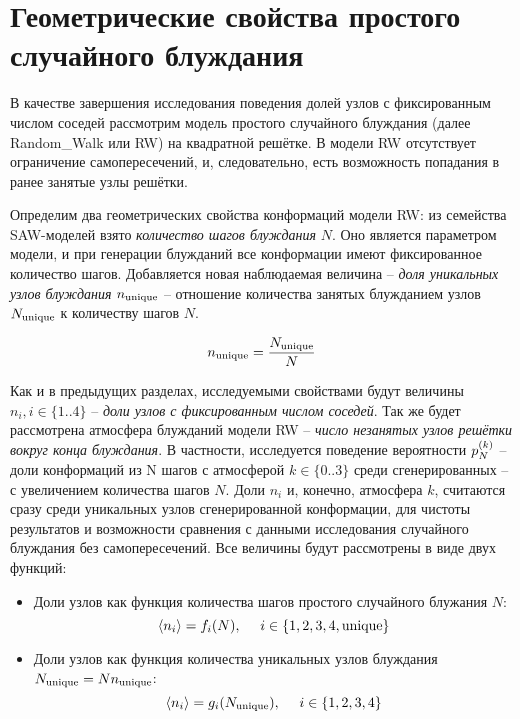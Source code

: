 \section{Геометрические свойства простого случайного блуждания}

В качестве завершения исследования поведения долей узлов с фиксированным числом соседей рассмотрим модель простого случайного блуждания (далее Random\_Walk или RW) на квадратной решётке. 
В модели RW отсутствует ограничение самопересечений, и, следовательно, есть возможность попадания в ранее занятые узлы решётки.

Определим два геометрических свойства конформаций модели RW: из семейства SAW-моделей взято \textit{количество шагов блуждания} $N$. 
Оно является параметром модели, и при генерации блужданий все конформации имеют фиксированное количество шагов.
Добавляется новая наблюдаемая величина -- \textit{доля уникальных узлов блуждания} $n_{\textup{unique}}$ -- отношение количества занятых блужданием узлов $N_{\textup{unique}}$ к количеству шагов $N$.

\begin{equation}
n_{\textup{unique}} = \frac{N_{\textup{unique}}}{N}
\label{eq:nun}
\end{equation}

Как и в предыдущих разделах, исследуемыми свойствами будут величины $n_i, i \in \{1..4\}$ -- \textit{доли узлов с фиксированным числом соседей}. 
Так же будет рассмотрена атмосфера блужданий модели RW -- \textit{число незанятых узлов решётки вокруг конца блуждания}. 
В частности, исследуется поведение вероятности $p^{(k)}_N$ -- доли конформаций из N шагов с атмосферой $k \in \{0..3\}$ среди сгенерированных -- с увеличением количества шагов $N$.
Доли $n_i$ и, конечно, атмосфера $k$, считаются сразу среди уникальных узлов сгенерированной конформации, для чистоты результатов и возможности сравнения с данными исследования случайного блуждания без самопересечений.
Все величины будут рассмотрены в виде двух функций:

\begin{itemize}
\item Доли узлов как функция количества шагов простого случайного блужания $N$: 
\begin{equation}
 \langle n_i \rangle = f_i(N),\ \ \ \ i \in \{1,2,3,4, \textup{unique}\}
\end{equation}
\item Доли узлов как функция количества уникальных узлов блуждания $N_{\textup{unique}} = N n_{\textup{unique}}$:
\begin{equation}
 \langle n_i \rangle = g_i(N_{\textup{unique}}),\ \ \ \ i \in \{1,2,3,4\} 
\end{equation}
\end{itemize}


